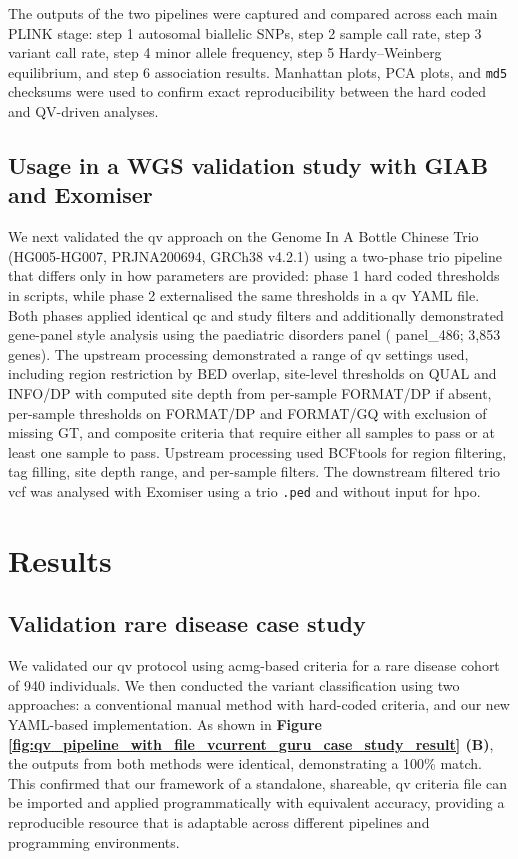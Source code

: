 The outputs of the two pipelines were captured and compared across each main PLINK stage: step 1 autosomal biallelic SNPs, step 2 sample call rate, step 3 variant call rate, step 4 minor allele frequency, step 5 Hardy–Weinberg equilibrium, and step 6 association results. Manhattan plots, PCA plots, and \texttt{md5} checksums were used to confirm exact reproducibility between the hard coded and QV-driven analyses.

\subsection{Usage in a WGS validation study with GIAB and Exomiser}

We next validated the \ac{qv} approach on the Genome In A Bottle Chinese Trio (HG005-HG007, PRJNA200694, GRCh38 v4.2.1) using a two-phase trio pipeline that differs only in how parameters are provided: phase 1 hard coded thresholds in scripts, while phase 2 externalised the same thresholds in a \ac{qv} YAML file. Both phases applied identical \ac{qc} and study filters and additionally demonstrated gene-panel style analysis using the paediatric disorders panel (\cite{lawless_panelapprex_2025} panel\_486; 3{,}853 genes). The upstream processing demonstrated a range of \ac{qv} settings used, including region restriction by BED overlap, site-level thresholds on QUAL and INFO/DP with computed site depth from per-sample FORMAT/DP if absent, per-sample thresholds on FORMAT/DP and FORMAT/GQ with exclusion of missing GT, and composite criteria that require either all samples to pass or at least one sample to pass. Upstream processing used BCFtools for region filtering, tag filling, site depth range, and per-sample filters. The downstream filtered trio \ac{vcf} was analysed with Exomiser using a trio \texttt{.ped} and without input for \ac{hpo}.

\section{Results}
\subsection{Validation rare disease case study}

We validated our \ac{qv} protocol using \ac{acmg}-based criteria for a rare disease cohort of 940 individuals. 
We then conducted the variant classification using two approaches: a conventional manual method with hard-coded criteria, and our new YAML-based implementation.
As shown in \textbf{Figure \ref{fig:qv_pipeline_with_file_vcurrent_guru_case_study_result} (B)}, 
the outputs from both methods were identical, demonstrating a 100\% match. This confirmed that our framework of a standalone, shareable, \ac{qv} criteria file can be imported and applied programmatically with equivalent accuracy, providing a reproducible resource that is adaptable across different pipelines and programming environments.


